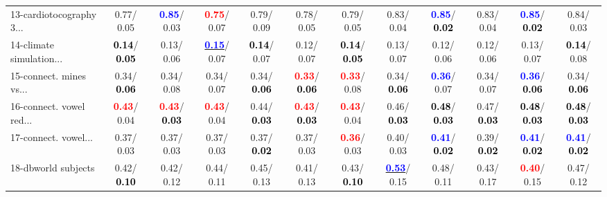 \begin{table}[h]
\begin{center}
{\begin{tabular}{lc|c|c|c|c|c|c|c|c|c|c}
13-cardiotocography 3... &   0.77/  0.05 & \textcolor{blue}{\textbf{  0.85}}/  0.03 & \textcolor{red}{\textbf{  0.75}}/  0.07 &   0.79/  0.09 &   0.78/  0.05 &   0.79/  0.05 &   0.83/  0.04 & \textcolor{blue}{\textbf{  0.85}}/\textcolor{black}{\textbf{  0.02}} &   0.83/  0.04 & \textcolor{blue}{\textbf{  0.85}}/\textcolor{black}{\textbf{  0.02}} &   0.84/  0.03 \\
14-climate simulation... & \textcolor{black}{\textbf{  0.14}}/\textcolor{black}{\textbf{  0.05}} &   0.13/  0.06 & \underline{\textcolor{blue}{\textbf{  0.15}}}/  0.07 & \textcolor{black}{\textbf{  0.14}}/  0.07 &   0.12/  0.07 & \textcolor{black}{\textbf{  0.14}}/\textcolor{black}{\textbf{  0.05}} &   0.13/  0.07 &   0.12/  0.06 &   0.12/  0.06 &   0.13/  0.07 & \textcolor{black}{\textbf{  0.14}}/  0.08 \\ \hline
15-connect. mines vs... &   0.34/\textcolor{black}{\textbf{  0.06}} &   0.34/  0.08 &   0.34/  0.07 &   0.34/\textcolor{black}{\textbf{  0.06}} & \textcolor{red}{\textbf{  0.33}}/\textcolor{black}{\textbf{  0.06}} & \textcolor{red}{\textbf{  0.33}}/  0.08 &   0.34/\textcolor{black}{\textbf{  0.06}} & \textcolor{blue}{\textbf{  0.36}}/  0.07 &   0.34/  0.07 & \textcolor{blue}{\textbf{  0.36}}/\textcolor{black}{\textbf{  0.06}} &   0.34/\textcolor{black}{\textbf{  0.06}} \\
16-connect. vowel red... & \textcolor{red}{\textbf{  0.43}}/  0.04 & \textcolor{red}{\textbf{  0.43}}/\textcolor{black}{\textbf{  0.03}} & \textcolor{red}{\textbf{  0.43}}/  0.04 &   0.44/\textcolor{black}{\textbf{  0.03}} & \textcolor{red}{\textbf{  0.43}}/\textcolor{black}{\textbf{  0.03}} & \textcolor{red}{\textbf{  0.43}}/  0.04 &   0.46/\textcolor{black}{\textbf{  0.03}} & \textcolor{black}{\textbf{  0.48}}/\textcolor{black}{\textbf{  0.03}} &   0.47/\textcolor{black}{\textbf{  0.03}} & \textcolor{black}{\textbf{  0.48}}/\textcolor{black}{\textbf{  0.03}} & \textcolor{black}{\textbf{  0.48}}/\textcolor{black}{\textbf{  0.03}} \\
17-connect. vowel... &   0.37/  0.03 &   0.37/  0.03 &   0.37/  0.03 &   0.37/\textcolor{black}{\textbf{  0.02}} &   0.37/  0.03 & \textcolor{red}{\textbf{  0.36}}/  0.03 &   0.40/  0.03 & \textcolor{blue}{\textbf{  0.41}}/\textcolor{black}{\textbf{  0.02}} &   0.39/\textcolor{black}{\textbf{  0.02}} & \textcolor{blue}{\textbf{  0.41}}/\textcolor{black}{\textbf{  0.02}} & \textcolor{blue}{\textbf{  0.41}}/\textcolor{black}{\textbf{  0.02}} \\
18-dbworld subjects &   0.42/\textcolor{black}{\textbf{  0.10}} &   0.42/  0.12 &   0.44/  0.11 &   0.45/  0.13 &   0.41/  0.13 &   0.43/\textcolor{black}{\textbf{  0.10}} & \underline{\textcolor{blue}{\textbf{  0.53}}}/  0.15 &   0.48/  0.11 &   0.43/  0.17 & \textcolor{red}{\textbf{  0.40}}/  0.15 &   0.47/  0.12 \\

\end{tabular}}
\end{center}
\end{table}

